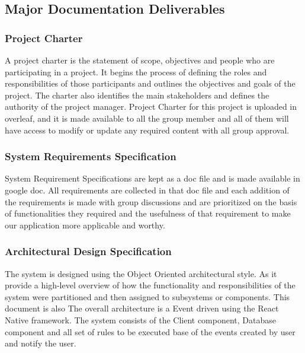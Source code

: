 
\subsection{Major Documentation Deliverables}

\subsubsection{Project Charter}
A project charter is the statement of scope, objectives and people who are participating in a project. It begins the process of defining the roles and responsibilities of those participants and outlines the objectives and goals of the project. The charter also identifies the main stakeholders and defines the authority of the project manager.
Project Charter for this project is uploaded in overleaf, and it is made available to all the group member and all of them will have access to modify or update any required content with all group approval.  

\subsubsection{System Requirements Specification}
System Requirement Specifications are kept as a doc file and is made available in google doc. All requirements are collected in that doc file and each addition of the requirements is made with group discussions and are prioritized on the basis of functionalities they required and the usefulness of that requirement to make our application more applicable and worthy.

\subsubsection{Architectural Design Specification}
The system is designed using the Object Oriented architectural style. As it provide a high-level overview of how the functionality and responsibilities of the system were partitioned and then assigned to subsystems or components. This document is also  The overall architecture is a Event driven using the React Native framework. The system consists of the Client component, Database component and all set of rules to be executed base of the events created by user and notify the user. 


